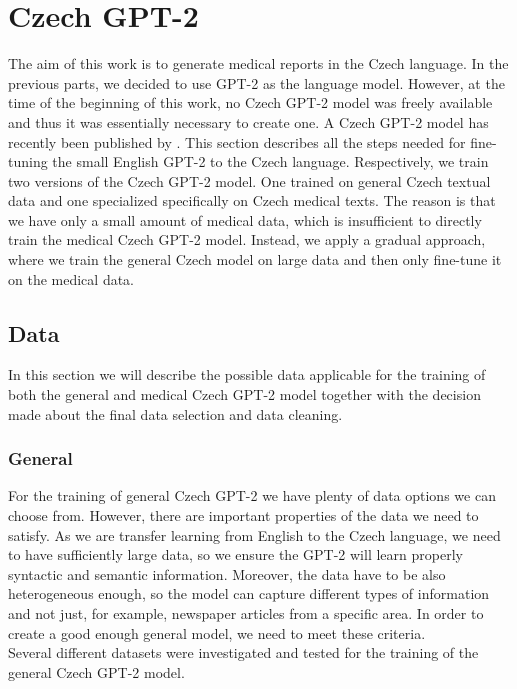 \section{Czech GPT-2}
\label{sec:czechGpt2}
The aim of this work is to generate medical reports in the Czech language. In the previous parts, we decided to use GPT-2 as the language model. However, at the time of the beginning of this work, no Czech GPT-2 model was freely available and thus it was essentially necessary to create one. A Czech GPT-2 model has recently been published by \citet{hajek_horak2022}. This section describes all the steps needed for fine-tuning the small English GPT-2 to the Czech language. Respectively, we train two versions of the Czech GPT-2 model. One trained on general Czech textual data and one specialized specifically on Czech medical texts. The reason is that we have only a small amount of medical data, which is insufficient to directly train the medical Czech GPT-2 model. Instead, we apply a gradual approach, where we train the general Czech model on large data and then only fine-tune it on the medical data.

\subsection{Data}
\label{sec:gptData}
In this section we will describe the possible data applicable for the training of both the general and medical Czech GPT-2 model together with the decision made about the final data selection and data cleaning.

\subsubsection{General}
For the training of general Czech GPT-2 we have plenty of data options we can choose from. However, there are important properties of the data we need to satisfy. As we are transfer learning from English to the Czech language, we need to have sufficiently large data, so we ensure the GPT-2 will learn properly syntactic and semantic information. Moreover, the data have to be also heterogeneous enough, so the model can capture different types of information and not just, for example, newspaper articles from a specific area. In order to create a good enough general model, we need to meet these criteria.\\

Several different datasets were investigated and tested for the training of the general Czech GPT-2 model.
